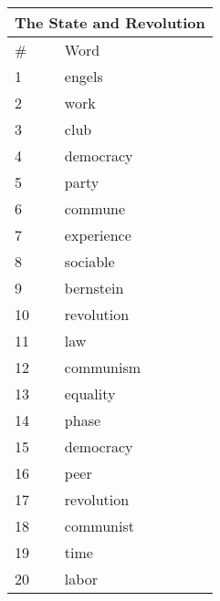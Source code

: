 
    \begin{center}
      \begin{tabular}{ | l | l | }
        \hline
        \multicolumn{2}{|c|}{The State and Revolution} \\ \hline
        \# & Word  \\ \hline
1 & engels \\ \hline 
2 & work \\ \hline 
3 & club \\ \hline 
4 & democracy \\ \hline 
5 & party \\ \hline 
6 & commune \\ \hline 
7 & experience \\ \hline 
8 & sociable \\ \hline 
9 & bernstein \\ \hline 
10 & revolution \\ \hline 
11 & law \\ \hline 
12 & communism \\ \hline 
13 & equality \\ \hline 
14 & phase \\ \hline 
15 & democracy \\ \hline 
16 & peer \\ \hline 
17 & revolution \\ \hline 
18 & communist \\ \hline 
19 & time \\ \hline 
20 & labor \\ \hline 

      \end{tabular}
    \end{center}
            